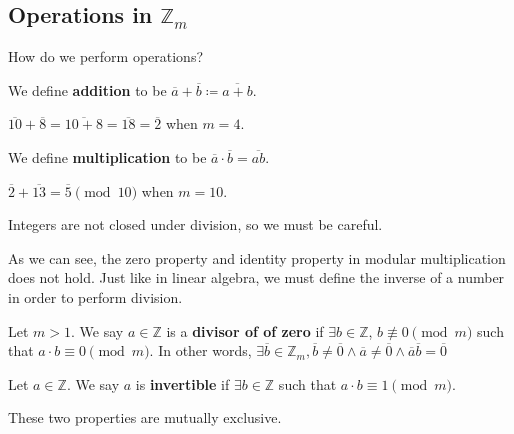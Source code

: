 \subsection{Operations in \( \mathbb{Z}_m \)}

How do we perform operations?

\begin{definition}
	We define \textbf{addition} to be \( \overline{a}+\overline{b} \coloneq \overline{a+b}     \).
\end{definition}

\begin{eg}
	\( \overline{10}+\overline{8}=\overline{10+8}=\overline{18}=\overline{2}    \) when \( m=4 \).
\end{eg}

\begin{definition}
	We define \textbf{multiplication} to be \( \overline{a}\cdot \overline{b}=\overline{ab}    \).
\end{definition}

\begin{eg}
	\( \overline{2}+\overline{13}=\overline{5} \pmod {10}   \) when \( m=10 \).
\end{eg}

\begin{note}
	Integers are not closed under division, so we must be careful. 
\end{note}

As we can see, the zero property and identity property in modular multiplication does not hold. Just like in linear algebra, we must define the inverse of a number in order to perform division.

\begin{definition}
	Let \( m>1 \). We say \( a\in \mathbb{Z} \) is a \textbf{divisor of of zero} if \( \exists b \in \mathbb{Z} \), \( b \not\equiv 0 \pmod m \) such that \( a \cdot b \equiv 0 \pmod m \). In other words, \( \exists \overline{b}\in \mathbb{Z}_m,\overline{b}\neq \overline{0}\land \overline{a}\neq \overline{0}  \land \overline{a}\overline{b}=\overline{0}       \)
\end{definition}

\begin{definition}
	Let \( a \in \mathbb{Z} \). We say \( a \) is \textbf{invertible} if \( \exists b \in \mathbb{Z} \) such that \( a \cdot b \equiv 1 \pmod m \).
\end{definition}

\begin{note}
	These two properties are mutually exclusive.
\end{note}

